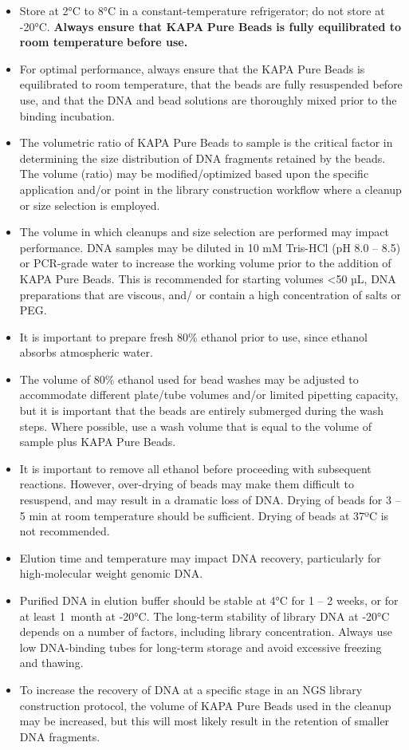 \documentclass[
  letterpaper,
  DIV=11,
  numbers=noendperiod]{scrreprt}
\begin{document}
\begin{itemize}
\item
  Store at 2°C to 8°C in a constant-temperature refrigerator; do not
  store at -20°C. \textbf{Always ensure that KAPA} \textbf{Pure Beads is
  fully equilibrated to room temperature} \textbf{before use.}
\item
  For optimal performance, always ensure that the KAPA Pure Beads is
  equilibrated to room temperature, that the beads are fully resuspended
  before use, and that the DNA and bead solutions are thoroughly mixed
  prior to the binding incubation.
\item
  The volumetric ratio of KAPA Pure Beads to sample is the critical
  factor in determining the size distribution of DNA fragments retained
  by the beads. The volume (ratio) may be modified/optimized based upon
  the specific application and/or point in the library construction
  workflow where a cleanup or size selection is employed.
\item
  The volume in which cleanups and size selection are performed may
  impact performance. DNA samples may be diluted in 10 mM Tris-HCl (pH
  8.0 -- 8.5) or PCR-grade water to increase the working volume prior to
  the addition of KAPA Pure Beads. This is recommended for starting
  volumes \textless50 µL, DNA preparations that are viscous, and/ or
  contain a high concentration of salts or PEG.
\item
  It is important to prepare fresh 80\% ethanol prior to use, since
  ethanol absorbs atmospheric water.
\item
  The volume of 80\% ethanol used for bead washes may be adjusted to
  accommodate different plate/tube volumes and/or limited pipetting
  capacity, but it is important that the beads are entirely submerged
  during the wash steps. Where possible, use a wash volume that is equal
  to the volume of sample plus KAPA Pure Beads.
\item
  It is important to remove all ethanol before proceeding with
  subsequent reactions. However, over-drying of beads may make them
  difficult to resuspend, and may result in a dramatic loss of DNA.
  Drying of beads for 3 -- 5 min at room temperature should be
  sufficient. Drying of beads at 37ºC is not recommended.
\item
  Elution time and temperature may impact DNA recovery, particularly for
  high-molecular weight genomic DNA.
\item
  Purified DNA in elution buffer should be stable at 4°C for 1 -- 2
  weeks, or for at least 1~month at -20°C. The long-term stability of
  library DNA at -20°C depends on a number of factors, including library
  concentration. Always use low DNA-binding tubes for long-term storage
  and avoid excessive freezing and thawing.
\item
  To increase the recovery of DNA at a specific stage in an NGS library
  construction protocol, the volume of KAPA Pure Beads used in the
  cleanup may be increased, but this will most likely result in the
  retention of smaller DNA fragments.
\end{itemize}
\end{document}
